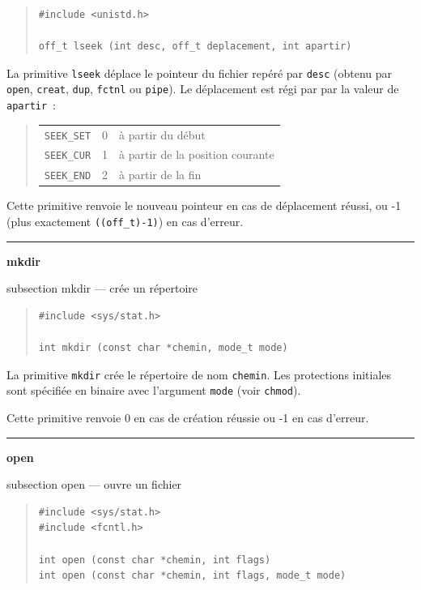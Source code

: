 \documentclass [twoside] {report}
\newcommand {\primitive} [1]
    {
	\phantomsection
	{\large \textbf {#1}}
	\addcontentsline {toc} {subsection} {#1}
    }
\newcommand {\separation}
    {
	\vspace {5mm}
	\nopagebreak
	\hrule
    }
\begin{document}
\begin {quote}
\begin {verbatim}
#include <unistd.h>

off_t lseek (int desc, off_t deplacement, int apartir)
\end{verbatim}
\end {quote}

La primitive \texttt {lseek} déplace le pointeur du
fichier repéré par \texttt {desc} (obtenu par
\texttt {open}, \texttt {creat}, \texttt {dup}, \texttt {fctnl} ou \texttt {pipe}).
Le déplacement est régi par par la valeur de
\texttt {apartir}~:

\begin {quote}
    \begin {tabular} {|lll|} \hline
	\texttt {SEEK\_SET} & 0 & à partir du début \\
	\texttt {SEEK\_CUR} & 1 & à partir de la position courante \\
	\texttt {SEEK\_END} & 2 & à partir de la fin \\ \hline
    \end {tabular}
\end {quote}

Cette primitive renvoie le nouveau pointeur en cas
de déplacement réussi, ou -1 (plus exactement \verb|((off_t)-1)|)
en cas d'erreur.




\separation
\primitive {mkdir} --- crée un répertoire

\begin {quote}
\begin {verbatim}
#include <sys/stat.h>

int mkdir (const char *chemin, mode_t mode)
\end{verbatim}
\end {quote}

La primitive \texttt {mkdir} crée le répertoire de nom \texttt {chemin}. Les 
protections initiales sont spécifiée en binaire avec l'argument
\texttt {mode} (voir \texttt {chmod}).

Cette primitive renvoie 0 en cas de création réussie
ou -1 en cas d'erreur.




\separation
\primitive {open} --- ouvre un fichier
    \label {open}

\begin {quote}
\begin {verbatim}
#include <sys/stat.h>
#include <fcntl.h>

int open (const char *chemin, int flags)
int open (const char *chemin, int flags, mode_t mode)
\end{verbatim}
\end {quote}
\end{document}
